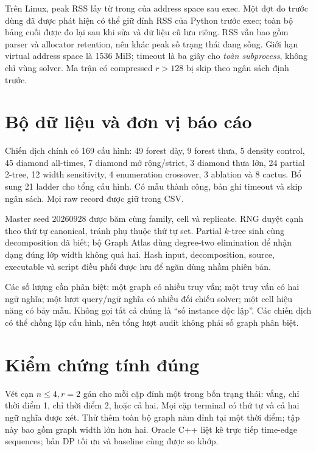 Trên Linux, peak RSS lấy từ  trong  của address space sau exec. Một đợt đo trước dùng  đã được phát hiện có thể giữ đỉnh RSS của Python trước exec; toàn bộ bảng cuối được đo lại sau khi sửa và dữ liệu cũ lưu riêng. RSS vẫn bao gồm parser và allocator retention, nên khác peak số trạng thái đang sống. Giới hạn virtual address space là 1536 MiB; timeout là ba giây cho \emph{toàn subprocess}, không chỉ vùng solver. Ma trận có compressed $r>128$ bị skip theo ngân sách định trước.

\section{Bộ dữ liệu và đơn vị báo cáo}

Chiến dịch chính có 169 cấu hình: 49 forest dày, 9 forest thưa, 5 density control, 45 diamond all-times, 7 diamond mở rộng/strict, 3 diamond thưa lớn, 24 partial 2-tree, 12 width sensitivity, 4 enumeration crossover, 3 ablation và 8 cactus. Bổ sung 21 ladder cho tổng \BenchCases{} cấu hình. Có \BenchSuccessfulSamples{} mẫu thành công, \BenchTimeouts{} bản ghi timeout và \BenchSkips{} skip ngân sách. Mọi raw record được giữ trong CSV.

Master seed $20260928$ được băm cùng family, cell và replicate. RNG duyệt cạnh theo thứ tự canonical, tránh phụ thuộc thứ tự set. Partial $k$-tree sinh cùng decomposition đã biết; bộ Graph Atlas dùng degree-two elimination để nhận dạng đúng lớp width không quá hai. Hash input, decomposition, source, executable và script điều phối được lưu để ngăn dùng nhầm phiên bản.

Các số lượng cần phân biệt: một graph có nhiều truy vấn; một truy vấn có hai ngữ nghĩa; một lượt query/ngữ nghĩa có nhiều đối chiếu solver; một cell hiệu năng có bảy mẫu. Không gọi tất cả chúng là ``số instance độc lập''. Các chiến dịch có thể chồng lặp cấu hình, nên tổng lượt audit không phải số graph phân biệt.

\section{Kiểm chứng tính đúng}



Vét cạn $n\le4,r=2$ gán cho mỗi cặp đỉnh một trong bốn trạng thái: vắng, chỉ thời điểm 1, chỉ thời điểm 2, hoặc cả hai. Mọi cặp terminal có thứ tự và cả hai ngữ nghĩa được xét. Thử thêm toàn bộ graph năm đỉnh tại một thời điểm; tập này bao gồm graph width lớn hơn hai. Oracle C++ liệt kê trực tiếp time-edge sequences; bản DP tối ưu và baseline cùng được so khớp.

